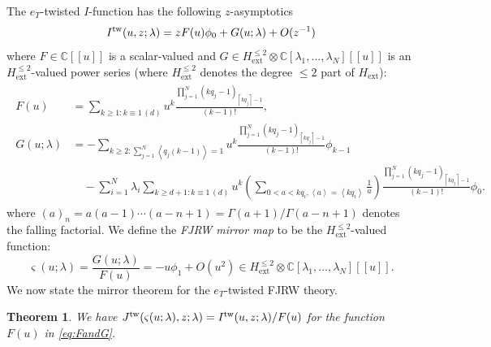 \documentclass[11pt]{amsart}
\newtheorem{thm}{Theorem}[section] %
\theoremstyle{definition} %
\theoremstyle{remark} %
\newcommand{\CC}{\mathbb C}
\newcommand{\tw}{{\rm tw}}
\def\fracp#1{\left\langle #1 \right\rangle}
\def\ceil#1{\left \lceil #1 \right \rceil}
\newcommand{\ext}{{\operatorname{ext}}}
\begin{document}
The $e_T$-twisted $I$-function 
has the following $z$-asymptotics 
\begin{equation} 
\label{eq:FJRW-I-asympt}
I^\tw(u,z;\lambda) = z F(u) \phi_0 + G(u;\lambda) + O(z^{-1}) 
\end{equation} 
where $F\in \CC[\![u]\!]$ is a scalar-valued and 
$G\in H_\ext^{\le 2}\otimes \CC[\lambda_1,\dots,\lambda_N][\![u]\!]$ 
is an $H_\ext^{\le 2}$-valued power series 
(where $H_\ext^{\le 2}$ denotes the degree 
$\le 2$ part of $H_\ext$): 
\begin{align}
\label{eq:FandG}  
\begin{split}  
F(u) & =  
\sum_{k \ge 1: k \equiv 1\, (d)} 
u^k 
\frac{
\prod_{j=1}^N 
(kq_j-1)_{\ceil{kq_j}-1}} 
{(k-1)!}, 
\\ 
G(u;\lambda) &= - 
\sum_{k\ge 2: \sum_{j=1}^N \fracp{q_j(k-1)} = 1} 
u^k 
\frac{
\prod_{j=1}^N (kq_j-1)_{\ceil{k q_j}-1}} 
{(k-1)!} 
\phi_{k-1} \\ 
& \quad - \sum_{i=1}^N \lambda_i 
\sum_{k\ge d+1: k\equiv 1\, (d)} 
u^k \left( 
\sum_{0<a<k q_i, \fracp{a} = \fracp{kq_i}}
\frac{1}{a}\right) 
\frac{
 \prod_{j=1}^N (kq_j-1)_{\ceil{kq_j}-1}} 
{(k-1)!} 
\phi_0.   
\end{split} 
\end{align} 
where $(a)_n = a(a-1) \cdots (a-n+1) = \Gamma(a+1)/\Gamma(a-n+1)$ 
denotes the falling factorial. 
We define the \emph{FJRW mirror map} to be 
the $H_\ext^{\le 2}$-valued function: 
\[
\varsigma(u;\lambda) = \frac{G(u;\lambda)}{F(u)} = - u \phi_1 + O(u^2) 
\in H_\ext^{\le 2} \otimes \CC[\lambda_1,\dots,\lambda_N][\![u]\!]. 
\]
We now state the mirror theorem for the $e_T$-twisted FJRW theory. 
\begin{thm} 
\label{thm:FJRW-mirrorthm}
We have $J^\tw(\varsigma(u;\lambda),z;\lambda) = I^\tw(u,z;\lambda)/F(u)$ 
for the function $F(u)$ in \eqref{eq:FandG}. 
\end{thm} 
\end{document}
